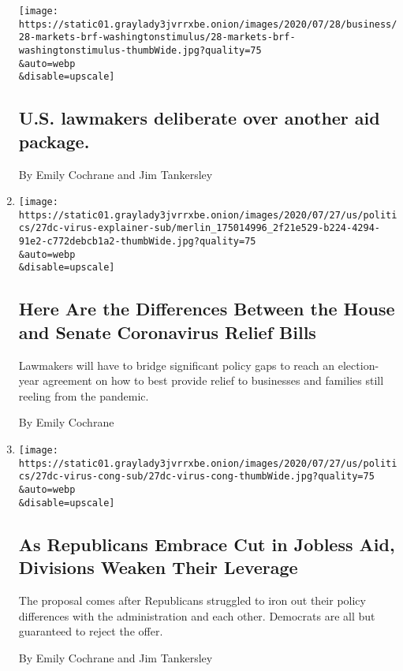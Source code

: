 \begin{enumerate}
  \texttt{[image: https://static01.graylady3jvrrxbe.onion/images/2020/07/28/business/28-markets-brf-washingtonstimulus/28-markets-brf-washingtonstimulus-thumbWide.jpg?quality=75\\\&auto=webp\\\&disable=upscale]}

  \hypertarget{us-lawmakers-deliberate-over-another-aid-package}{%
  \subsection{U.S. lawmakers deliberate over another aid
  package.}\label{us-lawmakers-deliberate-over-another-aid-package}}

  By Emily Cochrane and Jim Tankersley
\item
  \href{/2020/07/28/us/politics/coronavirus-relief-bills-house-senate.html}{}

  \texttt{[image: https://static01.graylady3jvrrxbe.onion/images/2020/07/27/us/politics/27dc-virus-explainer-sub/merlin\_175014996\_2f21e529-b224-4294-91e2-c772debcb1a2-thumbWide.jpg?quality=75\\\&auto=webp\\\&disable=upscale]}

  \hypertarget{here-are-the-differences-between-the-house-and-senate-coronavirus-relief-bills}{%
  \subsection{Here Are the Differences Between the House and Senate
  Coronavirus Relief
  Bills}\label{here-are-the-differences-between-the-house-and-senate-coronavirus-relief-bills}}

  Lawmakers will have to bridge significant policy gaps to reach an
  election-year agreement on how to best provide relief to businesses
  and families still reeling from the pandemic.

  By Emily Cochrane
\item
  \href{/2020/07/27/us/politics/republicans-jobless-aid.html}{}

  \texttt{[image: https://static01.graylady3jvrrxbe.onion/images/2020/07/27/us/politics/27dc-virus-cong-sub/27dc-virus-cong-thumbWide.jpg?quality=75\\\&auto=webp\\\&disable=upscale]}

  \hypertarget{as-republicans-embrace-cut-in-jobless-aid-divisions-weaken-their-leverage}{%
  \subsection{As Republicans Embrace Cut in Jobless Aid, Divisions
  Weaken Their
  Leverage}\label{as-republicans-embrace-cut-in-jobless-aid-divisions-weaken-their-leverage}}

  The proposal comes after Republicans struggled to iron out their
  policy differences with the administration and each other. Democrats
  are all but guaranteed to reject the offer.

  By Emily Cochrane and Jim Tankersley
\end{enumerate}


